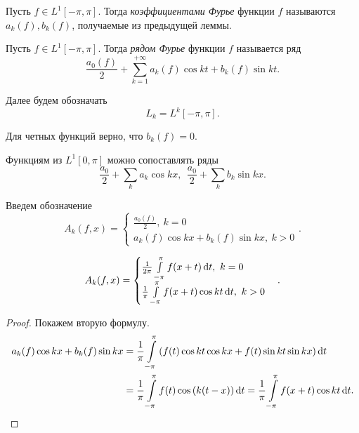 \begin{definition}
    Пусть $f \in L^1[-\pi, \pi]$. Тогда \textit{коэффициентами Фурье} функции $f$
    называются $a_k(f), b_k(f)$, получаемые из предыдущей леммы.
\end{definition}

\begin{definition}
    Пусть $f \in L^1[-\pi, \pi]$. Тогда \textit{рядом Фурье} функции $f$
    называется ряд
    \[
        \frac{a_0(f)}{2} + \sum_{k = 1}^{+\infty}{a_k(f) \cos{kt} + b_k(f) \sin{kt}}
    .\]
\end{definition}

\begin{remark}
    Далее будем обозначать
    \[
        L_k = L^k[-\pi, \pi]
    .\]
\end{remark}

\begin{remark}
    Для четных функций верно, что $b_k(f) = 0$.
\end{remark}

\begin{remark}
    Функциям из $L^1[0, \pi]$ можно сопоставлять ряды
    \[
        \frac{a_0}{2} + \sum_k{a_k \cos{kx}},~~ \frac{a_0}{2} + \sum_k{b_k \sin{kx}}
    .\]
\end{remark}

\begin{definition}
    Введем обозначение
    \[
        A_k(f, x) = \begin{cases}
            \frac{a_0(f)}{2},~ k = 0 \\
            a_k(f) \cos{kx} + b_k(f) \sin{kx},~ k > 0
        \end{cases}
    .\]
\end{definition}

\begin{lemma}
    \[
        A_k(f, x) = \begin{cases}
            \frac{1}{2\pi} \int\limits_{-\pi}^\pi{f(x + t) \,\mathrm{d}t},~ k = 0 \\
            \frac{1}{\pi} \int\limits_{-\pi}^\pi{f(x + t) \cos{kt} \,\mathrm{d}t},~ k > 0 \\
        \end{cases}
    .\]
\end{lemma}
\begin{proof}
    Покажем вторую формулу.
    \begin{align*}
        a_k(f) \cos{kx} + b_k(f) \sin{kx} 
        &= \frac{1}{\pi} \intl_{-\pi}^\pi{\parens*{
        f(t) \cos{kt} \cos{kx} + f(t) \sin{kt} \sin{kx}} \dd t} \\
        &= \frac{1}{\pi} \intl_{-\pi}^\pi{f(t) \cos{(k(t - x))} \dd t} =
        \frac{1}{\pi} \intl_{-\pi}^\pi{f(x + t) \cos{kt} \dd t}
    .\end{align*}
\end{proof}

